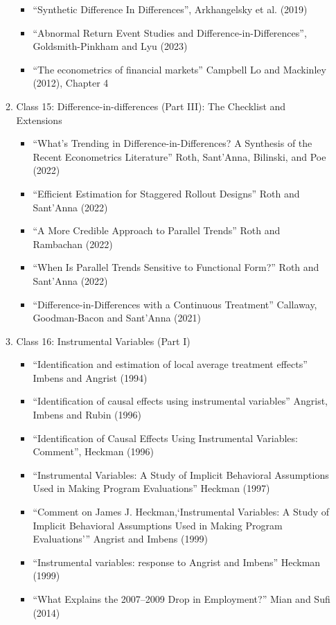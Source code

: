 \documentclass[11pt, a4paper]{article}
\begin{document}
\begin{enumerate}
\begin{enumerate}
\begin{itemize}
    \item ``Synthetic Difference In Differences'', Arkhangelsky et al. (2019)
    \item ``Abnormal Return Event Studies and Difference-in-Differences'', Goldsmith-Pinkham and Lyu (2023)
    \item ``The econometrics of financial markets'' Campbell Lo and Mackinley (2012), Chapter 4
    \end{itemize}
  \item Class 15: Difference-in-differences (Part III): The Checklist and Extensions
    \begin{itemize}
    \item ``What’s Trending in Difference-in-Differences? A Synthesis of the Recent Econometrics Literature'' Roth, Sant’Anna,  Bilinski, and Poe (2022)
    \item ``Efficient Estimation for Staggered Rollout Designs'' Roth and Sant'Anna (2022)
    \item ``A More Credible Approach to Parallel Trends'' Roth and Rambachan (2022)
    \item ``When Is Parallel Trends Sensitive to Functional Form?'' Roth and Sant'Anna (2022)
    \item ``Difference-in-Differences with a Continuous Treatment'' Callaway, Goodman-Bacon and Sant'Anna (2021)
    \end{itemize}
  \item Class 16: Instrumental Variables (Part I)
    \begin{itemize}
    \item ``Identification and estimation of local average treatment effects'' Imbens and Angrist (1994)
    \item ``Identification of causal effects using instrumental variables'' Angrist, Imbens and Rubin (1996)
    \item ``Identification of Causal Effects Using Instrumental Variables: Comment'', Heckman (1996)
    \item ``Instrumental Variables: A Study of Implicit Behavioral Assumptions Used in Making Program Evaluations'' Heckman (1997)
    \item ``Comment on James J. Heckman,`Instrumental Variables: A Study of Implicit Behavioral Assumptions Used in Making Program Evaluations''' Angrist and Imbens (1999)
    \item ``Instrumental variables: response to Angrist and Imbens'' Heckman (1999)
    \item ``What Explains the 2007–2009 Drop in Employment?'' Mian and Sufi (2014)

\end{itemize}
\end{enumerate}
\end{enumerate}
\end{document}
